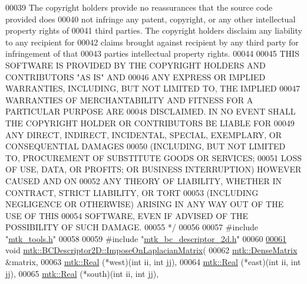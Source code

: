 \begin{DoxyCode}
00039 \textcolor{comment}{The copyright holders provide no reassurances that the source code provided does}
00040 \textcolor{comment}{not infringe any patent, copyright, or any other intellectual property rights of}
00041 \textcolor{comment}{third parties. The copyright holders disclaim any liability to any recipient for}
00042 \textcolor{comment}{claims brought against recipient by any third party for infringement of that}
00043 \textcolor{comment}{parties intellectual property rights.}
00044 \textcolor{comment}{}
00045 \textcolor{comment}{THIS SOFTWARE IS PROVIDED BY THE COPYRIGHT HOLDERS AND CONTRIBUTORS "AS IS" AND}
00046 \textcolor{comment}{ANY EXPRESS OR IMPLIED WARRANTIES, INCLUDING, BUT NOT LIMITED TO, THE IMPLIED}
00047 \textcolor{comment}{WARRANTIES OF MERCHANTABILITY AND FITNESS FOR A PARTICULAR PURPOSE ARE}
00048 \textcolor{comment}{DISCLAIMED. IN NO EVENT SHALL THE COPYRIGHT HOLDER OR CONTRIBUTORS BE LIABLE FOR}
00049 \textcolor{comment}{ANY DIRECT, INDIRECT, INCIDENTAL, SPECIAL, EXEMPLARY, OR CONSEQUENTIAL DAMAGES}
00050 \textcolor{comment}{(INCLUDING, BUT NOT LIMITED TO, PROCUREMENT OF SUBSTITUTE GOODS OR SERVICES;}
00051 \textcolor{comment}{LOSS OF USE, DATA, OR PROFITS; OR BUSINESS INTERRUPTION) HOWEVER CAUSED AND ON}
00052 \textcolor{comment}{ANY THEORY OF LIABILITY, WHETHER IN CONTRACT, STRICT LIABILITY, OR TORT}
00053 \textcolor{comment}{(INCLUDING NEGLIGENCE OR OTHERWISE) ARISING IN ANY WAY OUT OF THE USE OF THIS}
00054 \textcolor{comment}{SOFTWARE, EVEN IF ADVISED OF THE POSSIBILITY OF SUCH DAMAGE.}
00055 \textcolor{comment}{*/}
00056 
00057 \textcolor{preprocessor}{#include "\hyperlink{mtk__tools_8h}{mtk\_tools.h}"}
00058 
00059 \textcolor{preprocessor}{#include "\hyperlink{mtk__bc__descriptor__2d_8h}{mtk\_bc\_descriptor\_2d.h}"}
00060 
\hypertarget{mtk__bc__descriptor__2d_8cc_source_l00061}{}\hyperlink{classmtk_1_1BCDescriptor2D_a55617743d19ee506f768089716a1c381}{00061} \textcolor{keywordtype}{void} \hyperlink{classmtk_1_1BCDescriptor2D_a55617743d19ee506f768089716a1c381}{mtk::BCDescriptor2D::ImposeOnLaplacianMatrix}(
00062     \hyperlink{classmtk_1_1DenseMatrix}{mtk::DenseMatrix} &matrix,
00063     \hyperlink{group__c01-roots_gac080bbbf5cbb5502c9f00405f894857d}{mtk::Real} (*west)(\textcolor{keywordtype}{int} ii, \textcolor{keywordtype}{int} jj),
00064     \hyperlink{group__c01-roots_gac080bbbf5cbb5502c9f00405f894857d}{mtk::Real} (*east)(\textcolor{keywordtype}{int} ii, \textcolor{keywordtype}{int} jj),
00065     \hyperlink{group__c01-roots_gac080bbbf5cbb5502c9f00405f894857d}{mtk::Real} (*south)(\textcolor{keywordtype}{int} ii, \textcolor{keywordtype}{int} jj),

\end{DoxyCode}
